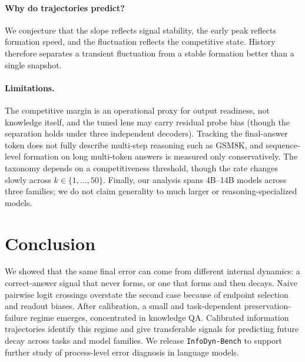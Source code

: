 \documentclass{article} %
\begin{document}
\paragraph{Why do trajectories predict?}
We conjecture that the slope reflects signal stability, the early peak reflects formation speed, and the fluctuation reflects the competitive state. History therefore separates a transient fluctuation from a stable formation better than a single snapshot.

\paragraph{Limitations.}
The competitive margin is an operational proxy for output readiness, not knowledge itself, and the tuned lens may carry residual probe bias (though the separation holds under three independent decoders). Tracking the final-answer token does not fully describe multi-step reasoning such as GSM8K, and sequence-level formation on long multi-token answers is measured only conservatively. The taxonomy depends on a competitiveness threshold, though the rate changes slowly across $k \in \{1,\ldots,50\}$. Finally, our analysis spans 4B--14B models across three families; we do not claim generality to much larger or reasoning-specialized models.

\section{Conclusion}

We showed that the same final error can come from different internal dynamics: a correct-answer signal that never forms, or one that forms and then decays. Naive pairwise logit crossings overstate the second case because of endpoint selection and readout biases. After calibration, a small and task-dependent preservation-failure regime emerges, concentrated in knowledge QA. Calibrated information trajectories identify this regime and give transferable signals for predicting future decay across tasks and model families. We release \texttt{InfoDyn-Bench} to support further study of process-level error diagnosis in language models.



\end{document}
